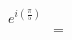 \documentclass[preview]{standalone}
\begin{document}
\begin{align*}
e^{i \left(\frac{\pi}{5}\right)} \\ &=
\end{align*}
\end{document}
